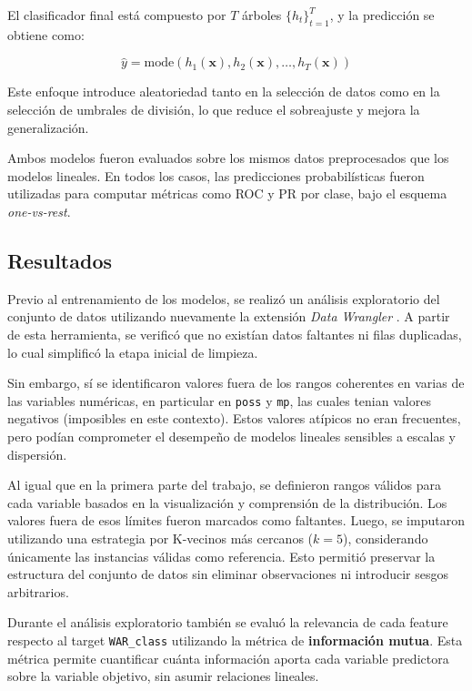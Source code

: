 \documentclass[11pt]{article}
\begin{document}
El clasificador final está compuesto por $T$ árboles $\{h_t\}_{t=1}^T$, y la predicción se obtiene como:

\[
\hat{y} = \text{mode} \left( h_1(\mathbf{x}), h_2(\mathbf{x}), \ldots, h_T(\mathbf{x}) \right)
\]

Este enfoque introduce aleatoriedad tanto en la selección de datos como en la selección de umbrales de división, lo que reduce el sobreajuste y mejora la generalización.

Ambos modelos fueron evaluados sobre los mismos datos preprocesados que los modelos lineales. En todos los casos, las predicciones probabilísticas fueron utilizadas para computar métricas como ROC y PR por clase, bajo el esquema \textit{one-vs-rest}.


\subsection{Resultados}

Previo al entrenamiento de los modelos, se realizó un análisis exploratorio del conjunto de datos utilizando nuevamente la extensión \textit{Data Wrangler} \cite{datawrangler2023}. A partir de esta herramienta, se verificó que no existían datos faltantes ni filas duplicadas, lo cual simplificó la etapa inicial de limpieza.

Sin embargo, sí se identificaron valores fuera de los rangos coherentes en varias de las variables numéricas, en particular en \texttt{poss} y \texttt{mp}, las cuales tenian valores negativos (imposibles en este contexto). Estos valores atípicos no eran frecuentes, pero podían comprometer el desempeño de modelos lineales sensibles a escalas y dispersión.

Al igual que en la primera parte del trabajo, se definieron rangos válidos para cada variable basados en la visualización y comprensión de la distribución. Los valores fuera de esos límites fueron marcados como faltantes. Luego, se imputaron utilizando una estrategia por K-vecinos más cercanos ($k=5$), considerando únicamente las instancias válidas como referencia. Esto permitió preservar la estructura del conjunto de datos sin eliminar observaciones ni introducir sesgos arbitrarios.

Durante el análisis exploratorio también se evaluó la relevancia de cada feature respecto al target \texttt{WAR\_class} utilizando la métrica de \textbf{información mutua}. Esta métrica permite cuantificar cuánta información aporta cada variable predictora sobre la variable objetivo, sin asumir relaciones lineales.
\end{document}
